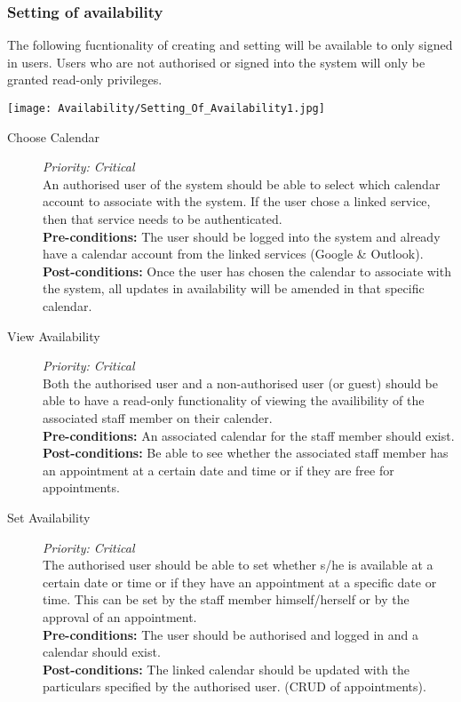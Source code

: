 \subsubsection{Setting of availability}
The following fucntionality of creating and setting will be available to only signed in users. Users who are not authorised or signed into the system will only be granted read-only privileges.

\texttt{[image: Availability/Setting\_Of\_Availability1.jpg]}

\begin{description}

\item[Choose Calendar]\hfill \textit{Priority: Critical} \\
An authorised user of the system should be able to select which calendar account to associate with the system. If the user chose a linked service, then that service needs to be authenticated.\\
\textbf{Pre-conditions:} The user should be logged into the system and already have a calendar account from the linked services (Google \& Outlook). \\
\textbf{Post-conditions:} Once the user has chosen the calendar to associate with the system, all updates in availability will be amended in that specific calendar.

\item[View Availability]\hfill \textit{Priority: Critical} \\
Both the authorised user and a non-authorised user (or guest) should be able to have a read-only functionality of viewing the availibility of the associated staff member on their calender.\\
\textbf{Pre-conditions:} An associated calendar for the staff member should exist.\\
\textbf{Post-conditions:} Be able to see whether the associated staff member has an appointment at a certain date and time or if they are free for appointments. 

\item[Set Availability]\hfill \textit{Priority: Critical} \\
The authorised user should be able to set whether s/he is available at a certain date or time or if they have an appointment at a specific date or time. This can be set by the staff member himself/herself or by the approval of an appointment.\\
\textbf{Pre-conditions:} The user should be authorised and logged in and a calendar should exist.\\
\textbf{Post-conditions:} The linked calendar should be updated with the particulars specified by the authorised user. (CRUD of appointments).
\end{description}